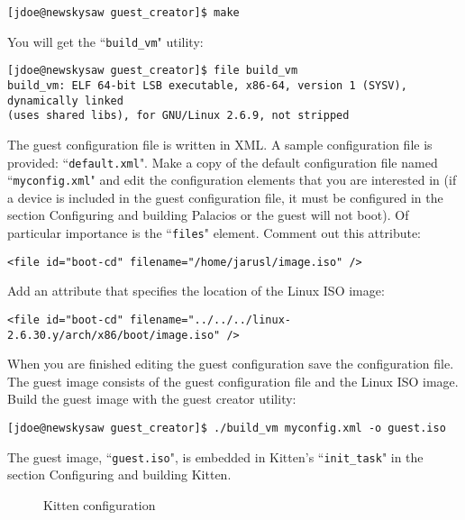 \documentclass{article}[11pt]
\def\colfigsize{\epsfxsize=5in}
\begin{document}
\begin{verbatim}
[jdoe@newskysaw guest_creator]$ make
\end{verbatim}

\noindent
You will get the ``\verb|build_vm|" utility:
\begin{verbatim}
[jdoe@newskysaw guest_creator]$ file build_vm
build_vm: ELF 64-bit LSB executable, x86-64, version 1 (SYSV), dynamically linked
(uses shared libs), for GNU/Linux 2.6.9, not stripped
\end{verbatim}

\noindent
The guest configuration file is written in XML. A sample configuration file is
provided: ``\verb|default.xml|". Make a copy of the default configuration file
named ``\verb|myconfig.xml|" and edit the configuration elements that you are
interested in (if a device is included in the guest configuration file, it
must be configured in the section Configuring and building Palacios or the guest
will not boot). Of particular importance is the ``\verb|files|" element. Comment
out this attribute:

\begin{verbatim}
<file id="boot-cd" filename="/home/jarusl/image.iso" />
\end{verbatim}

\noindent
Add an attribute that specifies the location of the Linux ISO image:

\begin{verbatim}
<file id="boot-cd" filename="../../../linux-2.6.30.y/arch/x86/boot/image.iso" />
\end{verbatim}

\noindent
When you are finished editing the guest configuration save the configuration
file. The guest image consists of the guest configuration file and the Linux
ISO image. Build the guest image with the guest creator utility:

\begin{verbatim}
[jdoe@newskysaw guest_creator]$ ./build_vm myconfig.xml -o guest.iso
\end{verbatim}

\noindent
The guest image, ``\verb+guest.iso+", is embedded in Kitten's
``\verb|init_task|" in the section Configuring and building Kitten.


\pagebreak
\begin{figure}[h]
  \begin{center}
    \colfigsize{}
  \end{center}
  \caption{Kitten configuration}
  \label{fig:kittencf}
\end{figure}
\end{document}
